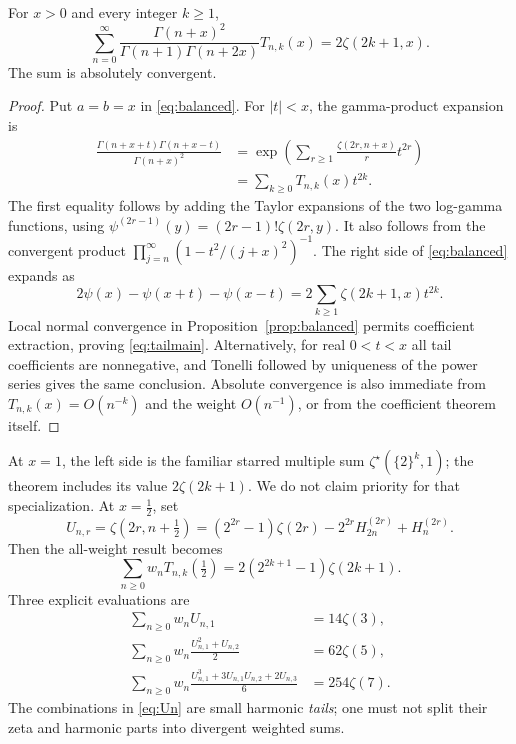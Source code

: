 \begin{theorem}\label{thm:tail}
For $x>0$ and every integer $k\ge1$,
\begin{equation}\label{eq:tailmain}
 \boxed{\sum_{n=0}^\infty
 \frac{\Gamma(n+x)^2}{\Gamma(n+1)\Gamma(n+2x)}
 T_{n,k}(x)=2\zeta(2k+1,x).}
\end{equation}
The sum is absolutely convergent.
\end{theorem}
\begin{proof}
Put $a=b=x$ in \eqref{eq:balanced}.
For $|t|<x$, the gamma-product expansion is
\begin{align*}
 \frac{\Gamma(n+x+t)\Gamma(n+x-t)}{\Gamma(n+x)^2}
 &=\exp\left(\sum_{r\ge1}\frac{\zeta(2r,n+x)}r t^{2r}\right)\\
 &=\sum_{k\ge0}T_{n,k}(x)t^{2k}.
\end{align*}
The first equality follows by adding the Taylor expansions of the two
log-gamma functions, using
$\psi^{(2r-1)}(y)=(2r-1)!\zeta(2r,y)$.
It also follows from the convergent product
$\prod_{j=n}^{\infty}(1-t^2/(j+x)^2)^{-1}$.
The right side of \eqref{eq:balanced} expands as
\[
 2\psi(x)-\psi(x+t)-\psi(x-t)
 =2\sum_{k\ge1}\zeta(2k+1,x)t^{2k}.
\]
Local normal convergence in Proposition~\ref{prop:balanced} permits
coefficient extraction, proving \eqref{eq:tailmain}.  Alternatively, for
real $0<t<x$ all tail coefficients are nonnegative, and Tonelli followed
by uniqueness of the power series gives the same conclusion.  Absolute
convergence is also immediate from $T_{n,k}(x)=O(n^{-k})$ and the
weight $O(n^{-1})$, or from the coefficient theorem itself.
\end{proof}

At $x=1$, the left side is the familiar starred multiple sum
$\zeta^\star(\{2\}^k,1)$; the theorem includes its value
$2\zeta(2k+1)$.  We do not claim priority for that specialization.
At $x=\tfrac12$, set
\begin{equation}\label{eq:Un}
 U_{n,r}=\zeta(2r,n+\tfrac12)
 =(2^{2r}-1)\zeta(2r)-2^{2r}H_{2n}^{(2r)}+H_n^{(2r)}.
\end{equation}
Then the all-weight result becomes
\begin{equation}\label{eq:tailhalf}
 \sum_{n\ge0}w_n T_{n,k}(\tfrac12)
 =2(2^{2k+1}-1)\zeta(2k+1).
\end{equation}
Three explicit evaluations are
\begin{align}
 \sum_{n\ge0}w_n U_{n,1}&=14\zeta(3),\label{eq:tail3}\\
 \sum_{n\ge0}w_n\frac{U_{n,1}^2+U_{n,2}}2&=62\zeta(5),\label{eq:tail5}\\
 \sum_{n\ge0}w_n\frac{U_{n,1}^3+3U_{n,1}U_{n,2}+2U_{n,3}}6
 &=254\zeta(7).\label{eq:tail7}
\end{align}
The combinations in \eqref{eq:Un} are small harmonic \emph{tails}; one must
not split their zeta and harmonic parts into divergent weighted sums.

